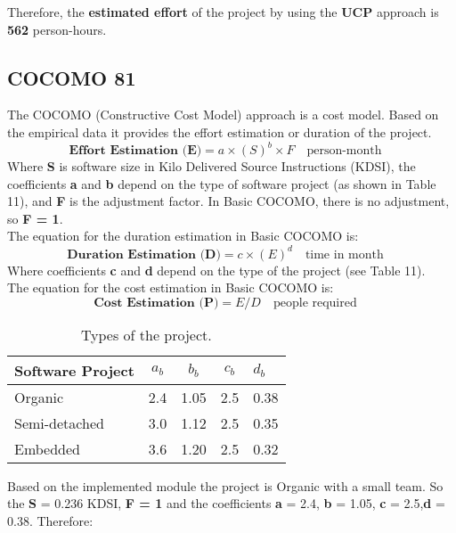 \documentclass[12pt]{article}
\begin{document}
Therefore, the \textbf{estimated effort} of the project by using the \textbf{UCP} approach is \textbf{562} person-hours.

\subsection{COCOMO 81}
The COCOMO (Constructive Cost Model) approach is a cost model. Based on the empirical data it provides the effort estimation or duration of the project. 
\begin{equation}
    \textbf{Effort Estimation (E)} = a\times (S)^{b}\times F \quad \textrm{person-month} \quad
\end{equation}
Where \textbf{S} is software size in Kilo Delivered Source Instructions (KDSI), the coefficients \textbf{a} and \textbf{b} depend on the type of software project (as shown in Table 11), and \textbf{F} is the adjustment factor. In Basic COCOMO, there is no adjustment, so \textbf{F = 1}.\\

The equation for the duration estimation in Basic COCOMO is:
\begin{equation}
    \textbf{Duration Estimation (D)} = c\times (E)^{d} \quad \textrm{time in month} \quad
\end{equation}
Where coefficients \textbf{c} and \textbf{d} depend on the type of the project (see Table 11).\\

The equation for the cost estimation in Basic COCOMO is: 
\begin{equation}
    \textbf{Cost Estimation (P)} = E/D \quad \textrm{people required} \quad
\end{equation}

\begin{table}[h]
\centering
\begin{tabular}{|l|l|l|l|l|}
\hline
\multicolumn{1}{|c|}{\textbf{Software Project}} & \multicolumn{1}{c|}{\textbf{$a_{b}$}} & \multicolumn{1}{c|}{\textbf{$b_{b}$}} & \multicolumn{1}{c|}{\textbf{$c_{b}$}} & \textbf{$d_{b}$} \\ \hline
Organic & 2.4 & 1.05 & 2.5 & 0.38 \\ \hline
Semi-detached & 3.0 & 1.12 & 2.5 & 0.35 \\ \hline
Embedded & 3.6 & 1.20 & 2.5 & 0.32 \\ \hline
\end{tabular}
\caption{Types of the project.}
\end{table}
Based on the implemented module the project is Organic with a small team. So the \textbf{S} = 0.236 KDSI, \textbf{F = 1} and the coefficients \textbf{a} = 2.4, \textbf{b} = 1.05, \textbf{c} = 2.5,\textbf{d} = 0.38. Therefore:\\ 
\end{document}
